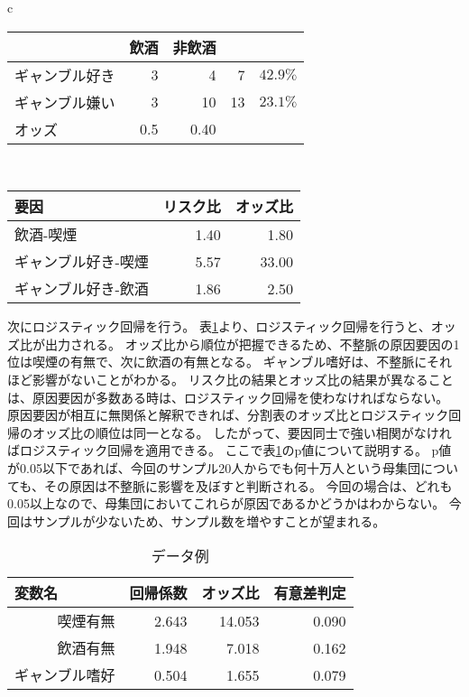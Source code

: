 \documentclass{ltjsarticle}
\begin{document}
\begin{table}[b]
\begin{tabular}{c}
\begin{minipage}{0.4\hsize}
\begin{tabular}{l|r|r|r|r}
                & 飲酒 & 非飲酒 & & \\ \hline \hline
                ギャンブル好き & 3 & 4 & 7 & $42.9\%$ \\
                ギャンブル嫌い & 3 & 10 & 13 & $23.1\%$ \\ \hline 
                オッズ & 0.5 & 0.40 & \multicolumn{2}{|l}{} \\ \hline
            \end{tabular}
        \end{minipage} \\
        \begin{minipage}{0.4\hsize}
            \centering
            \begin{tabular}{l|r|r} \hline 
                要因& \multicolumn{1}{|l|}{リスク比} & \multicolumn{1}{l}{オッズ比} \\\hline \hline
                飲酒-喫煙 & 1.40 & 1.80  \\
                ギャンブル好き-喫煙 & 5.57 & 33.00 \\
                ギャンブル好き-飲酒 & 1.86 & 2.50 \\ \hline 
            \end{tabular}
        \end{minipage}
    \end{tabular}
\end{table}

次にロジスティック回帰を行う。
表\ref{tbl:log_reg}より、ロジスティック回帰を行うと、オッズ比が出力される。
オッズ比から順位が把握できるため、不整脈の原因要因の1位は喫煙の有無で、次に飲酒の有無となる。
ギャンブル嗜好は、不整脈にそれほど影響がないことがわかる。
リスク比の結果とオッズ比の結果が異なることは、原因要因が多数ある時は、ロジスティック回帰を使わなければならない。
原因要因が相互に無関係と解釈できれば、分割表のオッズ比とロジスティック回帰のオッズ比の順位は同一となる。
したがって、要因同士で強い相関がなければロジスティック回帰を適用できる。
ここで表\ref{tbl:log_reg}のp値について説明する。
p値が0.05以下であれば、今回のサンプル20人からでも何十万人という母集団についても、その原因は不整脈に影響を及ぼすと判断される。
今回の場合は、どれも0.05以上なので、母集団においてこれらが原因であるかどうかはわからない。
今回はサンプルが少ないため、サンプル数を増やすことが望まれる。

\begin{table}[b]
    \caption{データ例}
    \label{tbl:log_reg}
    \centering
    \begin{tabular}{r|r|r|r} \hline
        \multicolumn{1}{l}{変数名} & \multicolumn{1}{|l|}{回帰係数} & \multicolumn{1}{l|}{オッズ比} & \multicolumn{1}{l}{有意差判定} \\ \hline \hline
        喫煙有無 & 2.643 & 14.053 & 0.090 \\
        飲酒有無 & 1.948 & 7.018 & 0.162 \\
        ギャンブル嗜好 & 0.504 & 1.655 & 0.079 \\ \hline
    \end{tabular}
\end{table}
\end{document}
